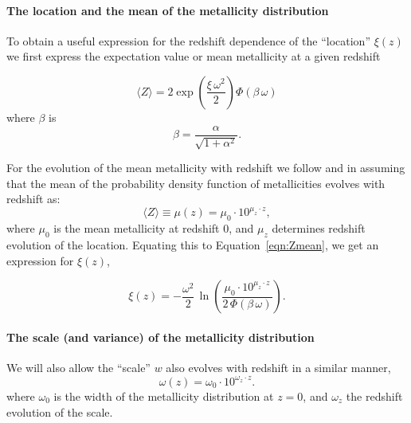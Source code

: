 \documentclass[twocolumn]{aastex631}
\begin{document}
\paragraph{The location and the mean of the metallicity distribution}
To obtain a useful expression for the redshift dependence of the ``location'' $\xi(z)$ we first express the expectation value or mean metallicity at a given redshift

\begin{equation}
 \langle  Z \rangle 
 = 2 \exp
        \left( \frac{\xi\,\omega^2}{2} \right)
         \Phi\left(\beta\, \omega\right)
 \label{eqn:Zmean}
\end{equation}
where $\beta$ is 
\begin{equation}
\label{eq: beta}
\beta = \frac{\alpha}{\sqrt{1 + \alpha^2} }.
\end{equation}

\noindent For the evolution of the mean metallicity with redshift we follow \cite{Neijssel+2019} and \cite{Langer2006} in assuming that the mean of the probability density function of metallicities evolves with redshift as:
\begin{equation}
\label{eq: mean Z}
    \langle Z \rangle \equiv \mu(z) = \mu_0 \cdot 10^{\mu_z \cdot z},
\end{equation}
where $\mu_0
$ is the mean metallicity at redshift 0, and $\mu_z
$ determines redshift evolution of the location. Equating this to Equation~\ref{eqn:Zmean}, we get an expression for $\xi(z)$,

\begin{equation}
\label{eq mu z}
    \xi(z) = -\frac{\omega^2}{2}\, \ln\left(\frac{  \mu_0 \cdot 10^{\mu_z \cdot z} }{2\, \Phi(\beta\, \omega)}  \right).
\end{equation}

\paragraph{The scale (and variance) of the metallicity distribution}

We will also allow the ``scale'' $w$ also evolves with redshift in a similar manner, 
\begin{equation}
\label{eq: sigma z}
    \omega(z) = \omega_0 \cdot 10^{\omega_z \cdot z}.
\end{equation}
where $\omega_0$ is
the width of the metallicity distribution at $z=0$, and $\omega_z$
the redshift evolution of the scale.
\end{document}
